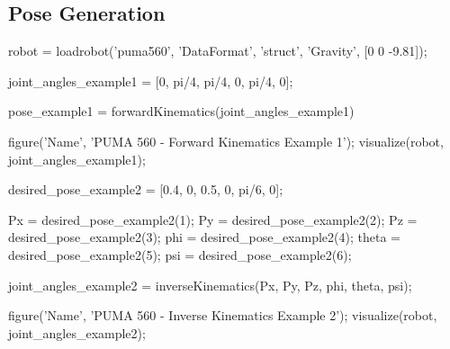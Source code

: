 \documentclass[conference]{IEEEtran}
\begin{document}
\subsection{Pose Generation}
\begin{matlabcode}[label={PoseGenAppendix}]


robot = loadrobot('puma560', 'DataFormat', 'struct', 'Gravity', [0 0 -9.81]);

joint_angles_example1 = [0, pi/4, pi/4, 0, pi/4, 0];

pose_example1 = forwardKinematics(joint_angles_example1)


figure('Name', 'PUMA 560 - Forward Kinematics Example 1');
visualize(robot, joint_angles_example1);

desired_pose_example2 = [0.4, 0, 0.5, 0, pi/6, 0];

Px = desired_pose_example2(1);
Py = desired_pose_example2(2);
Pz = desired_pose_example2(3);
phi = desired_pose_example2(4);
theta = desired_pose_example2(5);
psi = desired_pose_example2(6);

joint_angles_example2 = inverseKinematics(Px, Py, Pz, phi, theta, psi);

figure('Name', 'PUMA 560 - Inverse Kinematics Example 2');
visualize(robot, joint_angles_example2);
\end{matlabcode}
\end{document}
